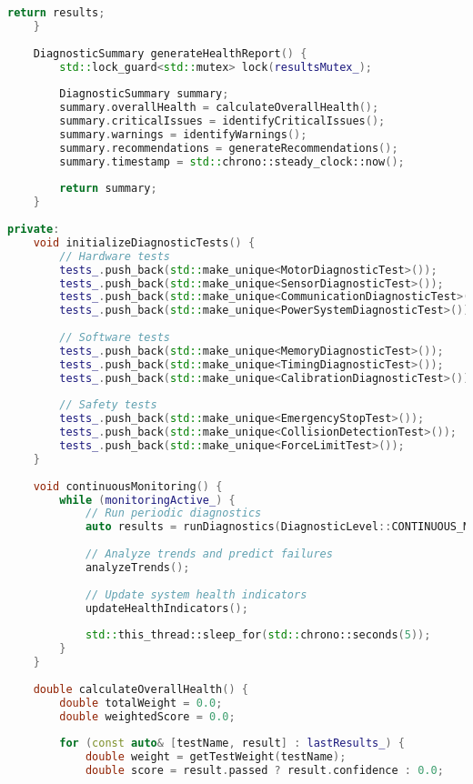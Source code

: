 \begin{lstlisting}[language=C++, caption=Self-Diagnostic System]
        return results;
    }
    
    DiagnosticSummary generateHealthReport() {
        std::lock_guard<std::mutex> lock(resultsMutex_);
        
        DiagnosticSummary summary;
        summary.overallHealth = calculateOverallHealth();
        summary.criticalIssues = identifyCriticalIssues();
        summary.warnings = identifyWarnings();
        summary.recommendations = generateRecommendations();
        summary.timestamp = std::chrono::steady_clock::now();
        
        return summary;
    }
    
private:
    void initializeDiagnosticTests() {
        // Hardware tests
        tests_.push_back(std::make_unique<MotorDiagnosticTest>());
        tests_.push_back(std::make_unique<SensorDiagnosticTest>());
        tests_.push_back(std::make_unique<CommunicationDiagnosticTest>());
        tests_.push_back(std::make_unique<PowerSystemDiagnosticTest>());
        
        // Software tests
        tests_.push_back(std::make_unique<MemoryDiagnosticTest>());
        tests_.push_back(std::make_unique<TimingDiagnosticTest>());
        tests_.push_back(std::make_unique<CalibrationDiagnosticTest>());
        
        // Safety tests
        tests_.push_back(std::make_unique<EmergencyStopTest>());
        tests_.push_back(std::make_unique<CollisionDetectionTest>());
        tests_.push_back(std::make_unique<ForceLimitTest>());
    }
    
    void continuousMonitoring() {
        while (monitoringActive_) {
            // Run periodic diagnostics
            auto results = runDiagnostics(DiagnosticLevel::CONTINUOUS_MONITORING);
            
            // Analyze trends and predict failures
            analyzeTrends();
            
            // Update system health indicators
            updateHealthIndicators();
            
            std::this_thread::sleep_for(std::chrono::seconds(5));
        }
    }
    
    double calculateOverallHealth() {
        double totalWeight = 0.0;
        double weightedScore = 0.0;
        
        for (const auto& [testName, result] : lastResults_) {
            double weight = getTestWeight(testName);
            double score = result.passed ? result.confidence : 0.0;
            

\end{lstlisting}
